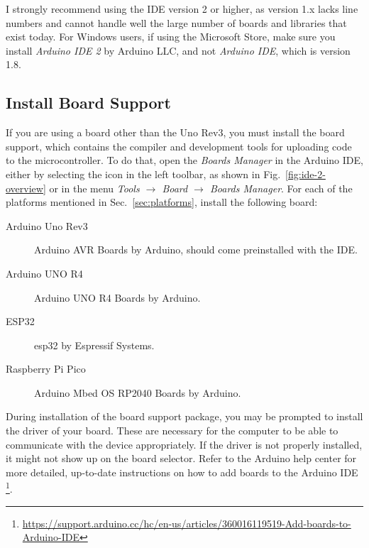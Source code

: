 I strongly recommend using the IDE version 2 or higher, as version 1.x lacks line numbers and cannot handle  well the large number of boards and libraries that exist today.
For Windows users, if using the Microsoft Store, make sure you install \emph{Arduino IDE 2} by Arduino LLC, and not \emph{Arduino IDE}, which is version 1.8.

\subsection{Install Board Support}
If you are using a board other than the Uno Rev3, you must install the board support, which contains the compiler and development tools for uploading code to the microcontroller.
To do that, open the \emph{Boards Manager} in the Arduino IDE, either by selecting the icon in the left toolbar, as shown in Fig.~\ref{fig:ide-2-overview} or in the menu \emph{Tools $\to$ Board $\to$ Boards Manager}.
For each of the platforms mentioned in Sec.~\ref{sec:platforms}, install the following board:
\begin{description}
\item[Arduino Uno Rev3] Arduino AVR Boards by Arduino, should come preinstalled with the IDE.
\item[Arduino UNO R4] Arduino UNO R4 Boards by Arduino.
\item[ESP32] esp32 by Espressif Systems.
\item[Raspberry Pi Pico] Arduino Mbed OS RP2040 Boards by Arduino.
\end{description}

During installation of the board support package, you may be prompted to install the driver of your board.
These are necessary for the computer to be able to communicate with the device appropriately.
If the driver is not properly installed, it might not show up on the board selector.
Refer to the Arduino help center for more detailed, up-to-date instructions on how to add boards to the Arduino IDE%
\footnote{\url{https://support.arduino.cc/hc/en-us/articles/360016119519-Add-boards-to-Arduino-IDE}}.

